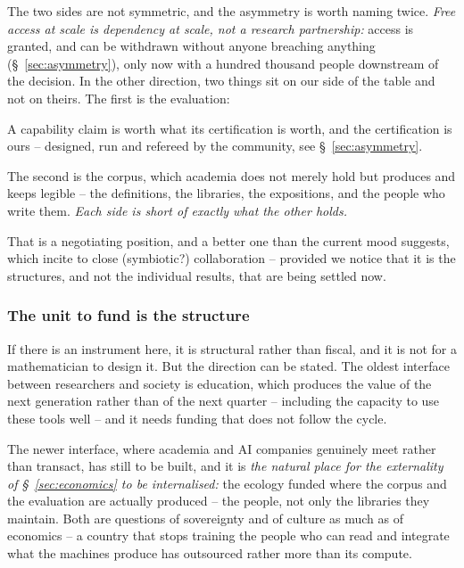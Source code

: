 \documentclass[11pt, a4paper,twosided]{amsart}
\newcommand{\key}[1]{\emph{#1}}
\begin{document}
The two sides are not symmetric, and the asymmetry is worth naming twice. \emph{Free access at scale is dependency at scale, not a research partnership:} access is granted, and can be withdrawn without anyone breaching anything (\S~\ref{sec:asymmetry}), only now with a hundred thousand people downstream of the decision. In the other direction, two things sit on our side of the table and not on theirs. The first is the evaluation:

\begin{pullquote}
 A capability claim is worth what its certification is worth, and the certification is ours -- designed, run and refereed by the community, see \S~\ref{sec:asymmetry}.  
\end{pullquote}
 
The second is the corpus, which academia does not merely hold but produces and keeps legible -- the definitions, the libraries, the expositions, and the people who write them. \key{Each side is short of exactly what the other holds.} 

That is a negotiating position, and a better one than the current mood suggests, which incite to close (symbiotic?) collaboration -- provided we notice that it is the structures, and not the individual results, that are being settled now.



\subsubsection{The unit to fund is the structure}


If there is an instrument here, it is structural rather than fiscal, and it is not for a mathematician to design it. But the direction can be stated. The oldest interface between researchers and society is education, which produces the value of the next generation rather than of the next quarter -- including the capacity to use these tools well -- and it needs funding that does not follow the cycle. 

The newer interface, where academia and AI companies genuinely meet rather than transact, has still to be built, and it is \emph{the natural place for the externality of \S~\ref{sec:economics} to be internalised:} the ecology funded where the corpus and the evaluation are actually produced -- the people, not only the libraries they maintain. Both are questions of sovereignty and of culture as much as of economics -- a country that stops training the people who can read and integrate what the machines produce has outsourced rather more than its compute. 
\end{document}
